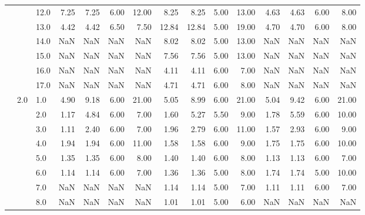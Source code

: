 \begin{tabular}{lllrrrrrrrrrrrr}
        &     & 12.0 &       7.25 &      7.25 & 6.00 &  12.00 &       8.25 &      8.25 & 5.00 &  13.00 &       4.63 &      4.63 & 6.00 &   8.00 \\
        &     & 13.0 &       4.42 &      4.42 & 6.50 &   7.50 &      12.84 &     12.84 & 5.00 &  19.00 &       4.70 &      4.70 & 6.00 &   8.00 \\
        &     & 14.0 &        NaN &       NaN &  NaN &    NaN &       8.02 &      8.02 & 5.00 &  13.00 &        NaN &       NaN &  NaN &    NaN \\
        &     & 15.0 &        NaN &       NaN &  NaN &    NaN &       7.56 &      7.56 & 5.00 &  13.00 &        NaN &       NaN &  NaN &    NaN \\
        &     & 16.0 &        NaN &       NaN &  NaN &    NaN &       4.11 &      4.11 & 6.00 &   7.00 &        NaN &       NaN &  NaN &    NaN \\
        &     & 17.0 &        NaN &       NaN &  NaN &    NaN &       4.71 &      4.71 & 6.00 &   8.00 &        NaN &       NaN &  NaN &    NaN \\
        & 2.0 & 1.0  &       4.90 &      9.18 & 6.00 &  21.00 &       5.05 &      8.99 & 6.00 &  21.00 &       5.04 &      9.42 & 6.00 &  21.00 \\
        &     & 2.0  &       1.17 &      4.84 & 6.00 &   7.00 &       1.60 &      5.27 & 5.50 &   9.00 &       1.78 &      5.59 & 6.00 &  10.00 \\
        &     & 3.0  &       1.11 &      2.40 & 6.00 &   7.00 &       1.96 &      2.79 & 6.00 &  11.00 &       1.57 &      2.93 & 6.00 &   9.00 \\
        &     & 4.0  &       1.94 &      1.94 & 6.00 &  11.00 &       1.58 &      1.58 & 6.00 &   9.00 &       1.75 &      1.75 & 6.00 &  10.00 \\
        &     & 5.0  &       1.35 &      1.35 & 6.00 &   8.00 &       1.40 &      1.40 & 6.00 &   8.00 &       1.13 &      1.13 & 6.00 &   7.00 \\
        &     & 6.0  &       1.14 &      1.14 & 6.00 &   7.00 &       1.36 &      1.36 & 5.00 &   8.00 &       1.74 &      1.74 & 5.00 &  10.00 \\
        &     & 7.0  &        NaN &       NaN &  NaN &    NaN &       1.14 &      1.14 & 5.00 &   7.00 &       1.11 &      1.11 & 6.00 &   7.00 \\
        &     & 8.0  &        NaN &       NaN &  NaN &    NaN &       1.01 &      1.01 & 5.00 &   6.00 &        NaN &       NaN &  NaN &    NaN \\

\end{tabular}
